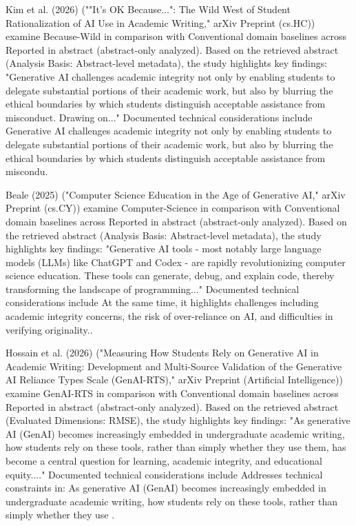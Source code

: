 \documentclass[10pt,twocolumn,letterpaper]{article}
\begin{document}
Kim et al. (2026) \cite{ref8} (""It's OK Because...": The Wild West of Student Rationalization of AI Use in Academic Writing," arXiv Preprint (cs.HC)) examine Because-Wild in comparison with Conventional domain baselines across Reported in abstract (abstract-only analyzed). Based on the retrieved abstract (Analysis Basis: Abstract-level metadata), the study highlights key findings: "Generative AI challenges academic integrity not only by enabling students to delegate substantial portions of their academic work, but also by blurring the ethical boundaries by which students distinguish acceptable assistance from misconduct. Drawing on..." Documented technical considerations include Generative AI challenges academic integrity not only by enabling students to delegate substantial portions of their academic work, but also by blurring the ethical boundaries by which students distinguish acceptable assistance from miscondu.

Beale (2025) \cite{ref9} ("Computer Science Education in the Age of Generative AI," arXiv Preprint (cs.CY)) examine Computer-Science in comparison with Conventional domain baselines across Reported in abstract (abstract-only analyzed). Based on the retrieved abstract (Analysis Basis: Abstract-level metadata), the study highlights key findings: "Generative AI tools - most notably large language models (LLMs) like ChatGPT and Codex - are rapidly revolutionizing computer science education. These tools can generate, debug, and explain code, thereby transforming the landscape of programming..." Documented technical considerations include At the same time, it highlights challenges including academic integrity concerns, the risk of over-reliance on AI, and difficulties in verifying originality..

Hossain et al. (2026) \cite{ref10} ("Measuring How Students Rely on Generative AI in Academic Writing: Development and Multi-Source Validation of the Generative AI Reliance Types Scale (GenAI-RTS)," arXiv Preprint (Artificial Intelligence)) examine GenAI-RTS in comparison with Conventional domain baselines across Reported in abstract (abstract-only analyzed). Based on the retrieved abstract (Evaluated Dimensions: RMSE), the study highlights key findings: "As generative AI (GenAI) becomes increasingly embedded in undergraduate academic writing, how students rely on these tools, rather than simply whether they use them, has become a central question for learning, academic integrity, and educational equity...." Documented technical considerations include Addresses technical constraints in: As generative AI (GenAI) becomes increasingly embedded in undergraduate academic writing, how students rely on these tools, rather than simply whether they use .
\end{document}

